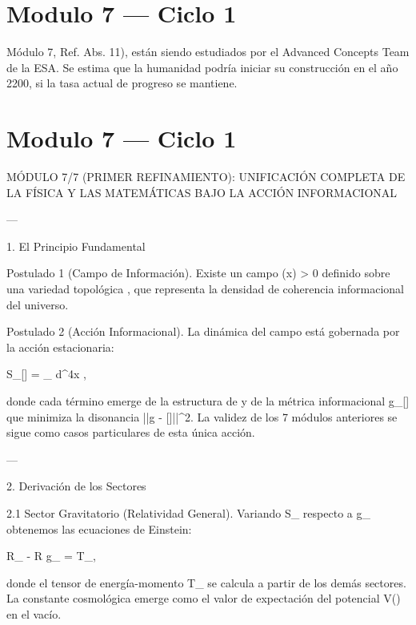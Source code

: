 \documentclass[12pt,twoside]{book}
\begin{document}
\chapter{Modulo 7 — Ciclo 1}
Módulo 7, Ref. Abs. 11), están siendo estudiados por el Advanced Concepts Team de la ESA. Se estima que la humanidad podría iniciar su construcción en el año 2200, si la tasa actual de progreso se mantiene.



\chapter{Modulo 7 — Ciclo 1}


MÓDULO 7/7 (PRIMER REFINAMIENTO): UNIFICACIÓN COMPLETA DE LA FÍSICA Y LAS MATEMÁTICAS BAJO LA ACCIÓN INFORMACIONAL

---

1. El Principio Fundamental

Postulado 1 (Campo de Información). Existe un campo \rho(x) > 0 definido sobre una variedad topológica , que representa la densidad de coherencia informacional del universo.

Postulado 2 (Acción Informacional). La dinámica del campo \rho está gobernada por la acción estacionaria:

S_{}[\rho] = \int_{} d^4x  ,

donde cada término emerge de la estructura de \rho y de la métrica informacional g_{\mu\nu}[\rho] que minimiza la disonancia ||g - [\rho]||^2. La validez de los 7 módulos anteriores se sigue como casos particulares de esta única acción.

---

2. Derivación de los Sectores

2.1 Sector Gravitatorio (Relatividad General).
Variando S_{} respecto a g_{\mu\nu} obtenemos las ecuaciones de Einstein:

R_{\mu\nu} -  R g_{\mu\nu} =  T_{\mu\nu},

donde el tensor de energía-momento T_{\mu\nu} se calcula a partir de los demás sectores. La constante cosmológica \Lambda emerge como el valor de expectación del potencial V(\rho) en el vacío.
\end{document}
